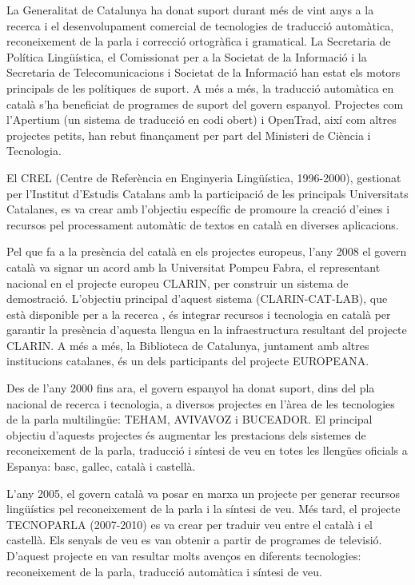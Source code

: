 \begin{multicols}{2}
La Generalitat de Catalunya ha donat suport durant més de vint anys a la recerca i el desenvolupament comercial de tecnologies de traducció automàtica, reconeixement de la parla i correcció ortogràfica i gramatical. La Secretaria de Política Lingüística, el Comissionat per a la Societat de la Informació i la Secretaria de Telecomunicacions i Societat de la Informació han estat els motors principals de les polítiques de suport. A més a més, la traducció automàtica en català s’ha beneficiat de programes de suport del govern espanyol. Projectes com l’Apertium (un sistema de traducció en codi obert) i OpenTrad, així com altres projectes petits, han rebut finançament per part del Ministeri de Ciència i Tecnologia. 

El CREL (Centre de Referència en Enginyeria Lingüística, 1996-2000), gestionat per l’Institut d’Estudis Catalans amb la participació de les principals Universitats Catalanes, es va crear amb l’objectiu específic de promoure la creació d’eines i recursos pel processament automàtic de textos en català en diverses aplicacions. 

Pel que fa a la presència del català en els projectes europeus, l’any 2008 el govern català va signar un acord amb la Universitat Pompeu Fabra, el representant nacional en el projecte europeu CLARIN, per construir un sistema de demostració. L’objectiu principal d’aquest sistema (CLARIN-CAT-LAB), que està disponible per a la recerca \cite{CAT-Nota30}, és integrar recursos i tecnologia en català per garantir la presència d’aquesta llengua en la infraestructura resultant del projecte CLARIN. A més a més, la Biblioteca de Catalunya, juntament amb altres institucions catalanes, és un dels participants del projecte EUROPEANA. 

Des de l’any 2000 fins ara, el govern espanyol ha donat suport, dins del pla nacional de recerca i tecnologia, a diversos projectes en l’àrea de les tecnologies de la parla multilingüe: TEHAM, AVIVAVOZ i BUCEADOR. El principal objectiu d’aquests projectes és augmentar les prestacions dels sistemes de reconeixement de la parla, traducció i síntesi de veu en totes les llengües oficials a Espanya: basc, gallec, català i castellà. 

L’any 2005, el govern català va posar en marxa un projecte per generar recursos lingüístics pel reconeixement de la parla i la síntesi de veu. Més tard, el projecte TECNOPARLA (2007-2010) es va crear per traduir veu entre el català i el castellà. Els senyals de veu es van obtenir a partir de programes de televisió. D’aquest projecte en van resultar molts avenços en diferents tecnologies: reconeixement de la parla, traducció automàtica i síntesi de veu.


\end{multicols}
